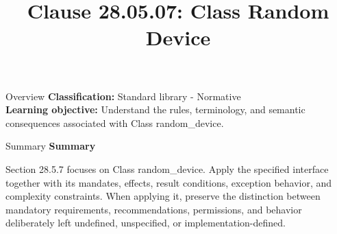 \documentclass[10pt,letterpaper]{article}
\title{Clause 28.05.07: Class Random Device}
\author{}
\date{}
\begin{document}
\maketitle
\begin{CornellOverviewBox}{Overview}
\textbf{Classification:} Standard library - Normative\\[2pt]
\textbf{Learning objective:} Understand the rules, terminology, and semantic consequences associated with Class random\_device.
\end{CornellOverviewBox}\begin{CornellSummaryBox}{Summary}
{\sffamily\bfseries\color{Accent} Summary}\par\vspace{3pt}Section 28.5.7 focuses on Class random\_device. Apply the specified interface together with its mandates, effects, result conditions, exception behavior, and complexity constraints. When applying it, preserve the distinction between mandatory requirements, recommendations, permissions, and behavior deliberately left undefined, unspecified, or implementation-defined.
\end{CornellSummaryBox}
\end{document}
